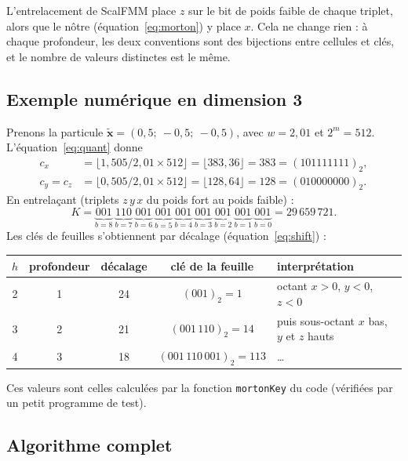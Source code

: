 \documentclass[11pt,a4paper]{article}
\newcommand{\code}[1]{\texttt{#1}}
\begin{document}
L'entrelacement de ScalFMM place $z$ sur le bit de poids faible de chaque triplet, alors que le
nôtre (équation~\eqref{eq:morton}) y place $x$. Cela ne change rien : à chaque profondeur, les deux
conventions sont des bijections entre cellules et clés, et le nombre de valeurs distinctes est le
même.

\subsection{Exemple numérique en dimension 3}

Prenons la particule $\tilde{\mathbf{x}} = (0{,}5;\ -0{,}5;\ -0{,}5)$, avec $w = 2{,}01$ et
$2^m = 512$. L'équation~\eqref{eq:quant} donne
\begin{align*}
c_x &= \lfloor 1{,}505/2{,}01 \times 512 \rfloor = \lfloor 383{,}36 \rfloor = 383 = (101111111)_2,\\
c_y = c_z &= \lfloor 0{,}505/2{,}01 \times 512 \rfloor = \lfloor 128{,}64 \rfloor = 128 = (010000000)_2.
\end{align*}
En entrelaçant (triplets $z\,y\,x$ du poids fort au poids faible) :
\[
K = \underbrace{001}_{b=8}\ \underbrace{110}_{b=7}\ \underbrace{001}_{b=6}\
    \underbrace{001}_{b=5}\ \underbrace{001}_{b=4}\ \underbrace{001}_{b=3}\
    \underbrace{001}_{b=2}\ \underbrace{001}_{b=1}\ \underbrace{001}_{b=0}
  = 29\,659\,721.
\]
Les clés de feuilles s'obtiennent par décalage (équation~\eqref{eq:shift}) :
\begin{center}
\begin{tabular}{cccc>{\raggedright\arraybackslash}p{5cm}}
\toprule
$h$ & profondeur & décalage & clé de la feuille & interprétation \\
\midrule
2 & 1 & 24 & $(001)_2 = 1$ & octant $x > 0$, $y < 0$, $z < 0$ \\
3 & 2 & 21 & $(001\,110)_2 = 14$ & puis sous-octant $x$ bas, $y$ et $z$ hauts \\
4 & 3 & 18 & $(001\,110\,001)_2 = 113$ & \dots \\
\bottomrule
\end{tabular}
\end{center}
Ces valeurs sont celles calculées par la fonction \code{mortonKey} du code (vérifiées par un petit
programme de test).

\subsection{Algorithme complet}
\end{document}
